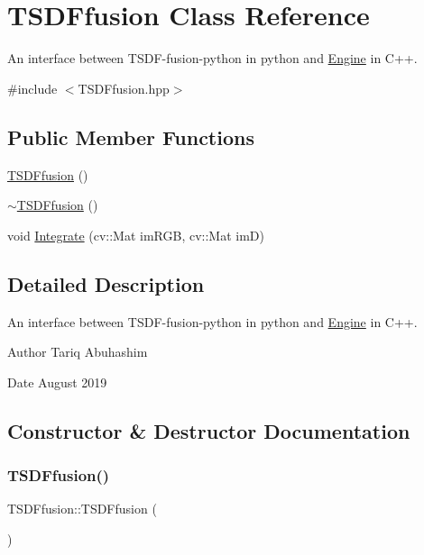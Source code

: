 \hypertarget{classTSDFfusion}{}\section{T\+S\+D\+Ffusion Class Reference}
\label{classTSDFfusion}


An interface between T\+S\+D\+F-\/fusion-\/python in python and \hyperlink{classEngine}{Engine} in C++.  




{\ttfamily \#include $<$T\+S\+D\+Ffusion.\+hpp$>$}

\subsection*{Public Member Functions}
\begin{DoxyCompactItemize}
\item 
\hyperlink{classTSDFfusion_ac8f00f9755ea367512343e0723d7b220}{T\+S\+D\+Ffusion} ()
\item 
\hyperlink{classTSDFfusion_afa9eb8698b5d6fea76a6e59f353251f4}{$\sim$\+T\+S\+D\+Ffusion} ()
\item 
void \hyperlink{classTSDFfusion_ac44b533ba8876f10aac2ee6309055687}{Integrate} (cv\+::\+Mat im\+R\+GB, cv\+::\+Mat imD)
\end{DoxyCompactItemize}


\subsection{Detailed Description}
An interface between T\+S\+D\+F-\/fusion-\/python in python and \hyperlink{classEngine}{Engine} in C++. 

\begin{DoxyAuthor}{Author}
Tariq Abuhashim 
\end{DoxyAuthor}
\begin{DoxyDate}{Date}
August 2019 
\end{DoxyDate}


\subsection{Constructor \& Destructor Documentation}
\mbox{\label{classTSDFfusion_ac8f00f9755ea367512343e0723d7b220}} 
\subsubsection{\texorpdfstring{T\+S\+D\+Ffusion()}{TSDFfusion()}}
{\footnotesize\ttfamily T\+S\+D\+Ffusion\+::\+T\+S\+D\+Ffusion (\begin{DoxyParamCaption}{ }\end{DoxyParamCaption})}

